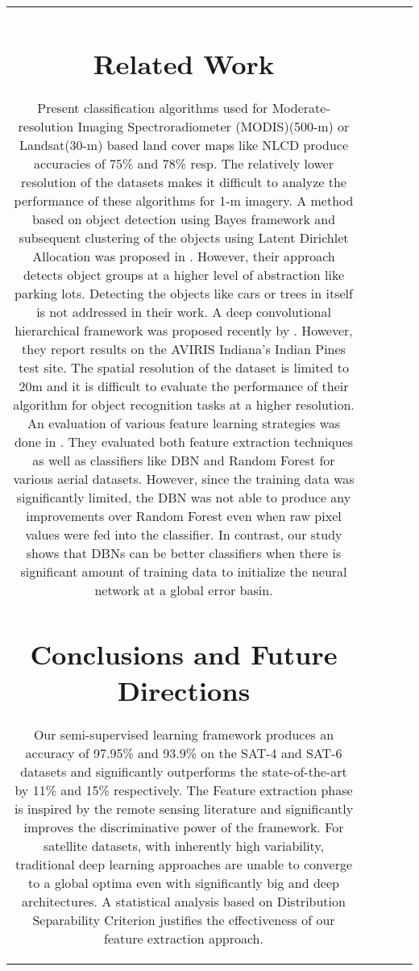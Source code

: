 \documentclass[11pt,a4paper]{article}
\begin{document}
\begin{table}[h!]
\begin{tabular}{ |c|c|c|c|c|}
\section{Related Work}
Present classification algorithms used for Moderate-resolution Imaging Spectroradiometer (MODIS)(500-m) \cite{Friedl_MCD_Coll5Validation2009} or Landsat(30-m) based land cover maps like NLCD \cite{wickham2013} produce accuracies of 75\% and 78\% resp. The relatively lower resolution of the datasets makes it difficult to analyze the performance of these algorithms for 1-m imagery. A method based on object detection using Bayes framework and subsequent clustering of the objects using Latent Dirichlet Allocation was proposed in \cite{Vaduva2012}. However, their approach detects object groups at a higher level of abstraction like parking lots. Detecting the objects like cars or trees in itself is not addressed in their work. A deep convolutional hierarchical framework was proposed recently by \cite{romerounsupervised}. However, they report results on the AVIRIS Indiana's Indian Pines test site. The spatial resolution of the dataset is limited to 20m and it is difficult to evaluate the performance of their algorithm for object recognition tasks at a higher resolution. An evaluation of various feature learning strategies was done in \cite{Tokarczyk2012}. They evaluated both feature extraction techniques as well as classifiers like DBN and Random Forest for various aerial datasets. However, since the training data was significantly limited, the DBN was not able to produce any improvements over Random Forest even when raw pixel values were fed into the classifier. In contrast, our study shows that DBNs can be better classifiers when there is significant amount of training data to initialize the neural network at a global error basin.  



\section{Conclusions and Future Directions}

Our semi-supervised learning framework produces an accuracy of 97.95\% and 93.9\% on the SAT-4 and SAT-6 datasets and significantly outperforms the state-of-the-art by 11\% and 15\% respectively. The Feature extraction phase is inspired by the remote sensing literature and significantly improves the discriminative power of the framework. For satellite datasets, with inherently high variability, traditional deep learning approaches are unable to converge to a global optima even with significantly big and deep architectures. A statistical analysis based on Distribution Separability Criterion justifies the effectiveness of our feature extraction approach.    


\end{tabular}
\end{table}
\end{document}
